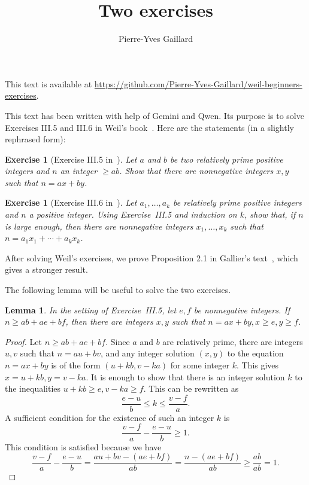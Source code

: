 \documentclass[12pt,letterpaper]{article}
\title{Two exercises} \author{Pierre-Yves Gaillard} \date{}
\newtheorem{lem}[thm]{Lemma} %
\newtheorem{exo}[thm]{Exercise}
\begin{document}

\maketitle %
\begin{center}
{\scriptsize This text is available at \url{https://github.com/Pierre-Yves-Gaillard/weil-beginners-exercises}.}
\end{center}

This text has been written with help of Gemini and Qwen. Its purpose is to solve Exercises III.5 and III.6 in Weil's book~\cite{weil1979}. Here are the statements (in a slightly rephrased form): 

\begin{exo}[Exercise III.5 in~\cite{weil1979}] 
Let $a$ and $b$ be two relatively prime positive integers and $n$ an integer $\ge ab$. Show that there are nonnegative integers $x,y$ such that $n=ax+by$. 
\end{exo} 

\begin{exo}[Exercise III.6 in~\cite{weil1979}] 
Let $a_1,\ldots,a_k$ be relatively prime positive integers and $n$ a positive integer. Using Exercise~III.5 and induction on $k$, show that, if $n$ is large enough, then there are nonnegative integers $x_1,\ldots,x_k$ such that $n=a_1x_1+\cdots+a_kx_k$. 
\end{exo} 

After solving Weil's exercises, we prove Proposition 2.1 in Gallier's text~\cite{gallier}, which gives a stronger result. 

The following lemma will be useful to solve the two exercises. 

\begin{lem}\label{L3}
In the setting of Exercise~III.5, let $e,f$ be nonnegative integers. If $n\ge ab+ae+bf$, then there are integers $x,y$ such that $n=ax+by,x\ge e,y\ge f$. 
\end{lem}

\begin{proof} 
Let $n\ge ab+ae+bf$. Since $a$ and $b$ are relatively prime, there are integers $u,v$ such that $n=au+bv$, and any integer solution $(x,y)$ to the equation $n=ax+by$ is of the form $(u+kb,v-ka)$ for some integer $k$. This gives $x=u+kb,y=v-ka$. It is enough to show that there is an integer solution $k$ to the inequalities $u+kb\ge e,v-ka\ge f$. This can be rewritten as 
$$
\frac{e-u}{b}\le k\le\frac{v-f}{a}.
$$ 
A sufficient condition for the existence of such an integer $k$ is 
$$
\frac{v-f}{a}-\frac{e-u}{b}\ge1.
$$ 
This condition is satisfied because we have 
$$
\frac{v-f}{a}-\frac{e-u}{b}=\frac{au+bv-(ae+bf)}{ab}=\frac{n-(ae+bf)}{ab}\ge\frac{ab}{ab}=1.
$$ 
\end{proof} 
\end{document}
